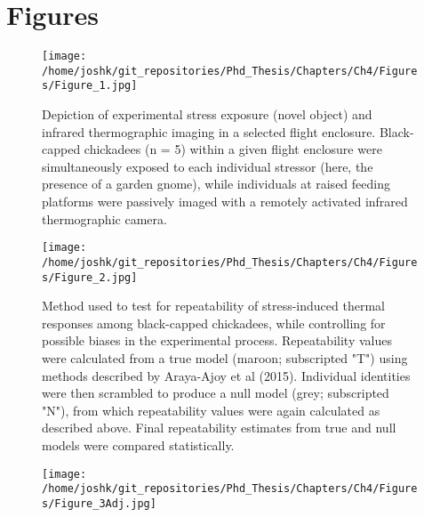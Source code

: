 \documentclass[12pt]{article}
\begin{document}
\clearpage 

\section*{Figures}

\begin{figure}[ht]
	\centering
	\texttt{[image: /home/joshk/git\_repositories/Phd\_Thesis/Chapters/Ch4/Figures/Figure\_1.jpg]}
    \caption[\hspace{0.5cm}Depiction of experimental stress exposure (novel object) and infrared thermographic imaging in a selected flight enclosure.]{Depiction of experimental stress exposure (novel object) and infrared thermographic imaging in a selected flight enclosure. Black-capped chickadees (n = 5) within a given flight enclosure were simultaneously exposed to each individual stressor (here, the presence of a garden gnome), while individuals at raised feeding platforms were passively imaged with a remotely activated infrared thermographic camera.
}
\label{Fig4.1}
\end{figure}

\clearpage

\begin{figure}[ht]
	\centering
    \captionsetup{width=0.9\linewidth}
	\texttt{[image: /home/joshk/git\_repositories/Phd\_Thesis/Chapters/Ch4/Figures/Figure\_2.jpg]}
    \caption[\hspace{0.5cm}Method used to test for repeatability of stress-induced thermal responses among black-capped chickadees, while controlling for possible biases in the experimental process.]{Method used to test for repeatability of stress-induced thermal responses among black-capped chickadees, while controlling for possible biases in the experimental process. Repeatability values were calculated from a true model (maroon; subscripted "T") using methods described by Araya-Ajoy et al (2015). Individual identities were then scrambled to produce a null model (grey; subscripted "N"), from which repeatability values were again calculated as described above. Final repeatability estimates from true and null models were compared statistically.
    }
\label{Fig4.2}
\end{figure}
\clearpage

\begin{figure}[ht]
	\centering
	\texttt{[image: /home/joshk/git\_repositories/Phd\_Thesis/Chapters/Ch4/Figures/Figure\_3Adj.jpg]}
    \captionsetup{labelformat=empty}
    \caption[\hspace{0.5cm}Acute changes in eye region temperature (T\textsubscript{s}) and dry heat transfer (q\textsubscript{Tot}) following stress exposure in black-capped chickadee (n = 19) across ambient temperature.]{ }
\label{Fig4.3}
\end{figure}
\clearpage
\end{document}
